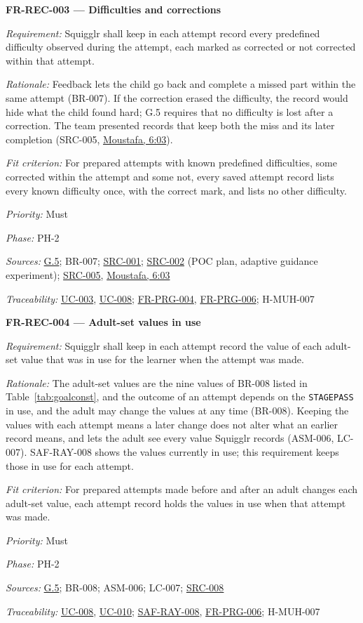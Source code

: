 \documentclass[12pt]{article}
\renewcommand{\_}{\textunderscore\allowbreak}%
\newcommand{\intlink}[3]{\hyperref[int:#1-#2]{#3}}
\newcommand{\intref}[2]{\intlink{#1}{#2}{#1, #2}}
\newcommand{\goalref}[1]{\hyperref[goal:#1]{G.#1}}
\newcommand{\ucref}[1]{\hyperref[uc:#1]{\mbox{UC-#1}}}
\newenvironment{srsrequirement}[2]{%
  \par\medskip\noindent\phantomsection\label{req:#1}%
  \textbf{#1 --- #2}\par\nobreak\smallskip }{\par\medskip}
\newcommand{\reqfield}[2]{\noindent\textit{#1:} #2\par}
\newcommand{\reqshall}[1]{\reqfield{Requirement}{#1}}
\newcommand{\reqrationale}[1]{\reqfield{Rationale}{#1}}
\newcommand{\reqfit}[1]{\reqfield{Fit criterion}{#1}}
\newcommand{\reqpriority}[1]{\reqfield{Priority}{#1}}
\newcommand{\reqphase}[1]{\reqfield{Phase}{#1}}
\newcommand{\reqsources}[1]{\reqfield{Sources}{#1}}
\newcommand{\reqtraces}[1]{\reqfield{Traceability}{#1}}
\newcommand{\reqref}[1]{\hyperref[req:#1]{#1}}
\newcommand{\srcref}[1]{\hyperref[src:#1]{SRC-#1}}
\providecommand{\ucref}[1]{\hyperref[uc:#1]{UC-#1}}
\begin{document}
\begin{srsrequirement}{FR-REC-003}{Difficulties and corrections}
  \reqshall{Squigglr shall keep in each attempt record every predefined
difficulty observed during the attempt, each marked as corrected or not
corrected within that attempt.} \reqrationale{Feedback lets the child go back
and complete a missed part within the same attempt (BR-007). If the correction
erased the difficulty, the record would hide what the child found hard; G.5
requires that no difficulty is lost after a correction. The team presented
records that keep both the miss and its later completion (SRC-005,
\intref{Moustafa}{6:03}).} \reqfit{For prepared attempts with known predefined
difficulties, some corrected within the attempt and some not, every saved
attempt record lists every known difficulty once, with the correct mark, and
lists no other difficulty.}
  \reqpriority{Must}
  \reqphase{PH-2}
  \reqsources{\goalref{5}; BR-007; \srcref{001}; \srcref{002} (POC plan,
adaptive guidance experiment); \srcref{005}, \intref{Moustafa}{6:03}}
\reqtraces{\ucref{003}, \ucref{008}; \reqref{FR-PRG-004}, \reqref{FR-PRG-006};
H-MUH-007}
\end{srsrequirement}

\begin{srsrequirement}{FR-REC-004}{Adult-set values in use}
  \reqshall{Squigglr shall keep in each attempt record the value of each
adult-set value that was in use for the learner when the attempt was made.}
\reqrationale{The adult-set values are the nine values of BR-008 listed in
Table~\ref{tab:goalconst}, and the outcome of an attempt depends on the
\texttt{STAGE\_\allowbreak PASS} in use, and the adult may change the values at
any time (BR-008). Keeping the values with each attempt means a later change
does not alter what an earlier record means, and lets the adult see every value
Squigglr records (ASM-006, LC-007). SAF-RAY-008 shows the values currently in
use; this requirement keeps those in use for each attempt.} \reqfit{For prepared
attempts made before and after an adult changes each adult-set value, each
attempt record holds the values in use when that attempt was made.}
  \reqpriority{Must}
  \reqphase{PH-2}
  \reqsources{\goalref{5}; BR-008; ASM-006; LC-007; \srcref{008}}
  \reqtraces{\ucref{008}, \ucref{010}; \reqref{SAF-RAY-008},
  \reqref{FR-PRG-006}; H-MUH-007}
\end{srsrequirement}
\end{document}
